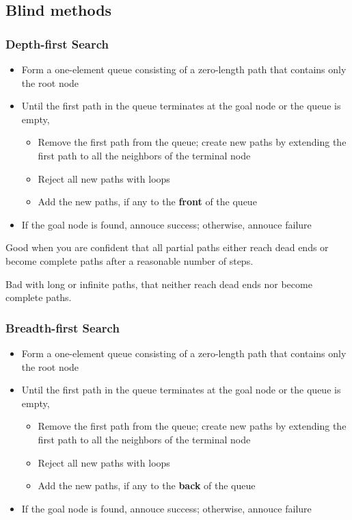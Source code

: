 \documentclass{article}
\begin{document}
\subsection{Blind methods}

\subsubsection{Depth-first Search}

\begin{itemize}
  \item Form a one-element queue consisting of a zero-length path
    that contains only the root node
  \item Until the first path in the queue terminates at the goal node or the queue is empty,
    \begin{itemize}
      \item Remove the first path from the queue; create new paths
        by extending the first path to all the neighbors of the 
        terminal node
      \item Reject all new paths with loops
      \item Add the new paths, if any to the \textbf{front} of the queue
    \end{itemize}
  \item If the goal node is found, annouce success; otherwise, annouce 
    failure
\end{itemize}

Good when you are confident that all partial paths either reach dead ends
or become complete paths after a reasonable number of steps.

Bad with long or infinite paths, that neither reach dead ends 
nor become complete paths.

\subsubsection{Breadth-first Search}

\begin{itemize}
  \item Form a one-element queue consisting of a zero-length path
    that contains only the root node
  \item Until the first path in the queue terminates at the goal node 
    or the queue is empty,
    \begin{itemize}
      \item Remove the first path from the queue; create new paths
        by extending the first path to all the neighbors of the 
        terminal node
      \item Reject all new paths with loops
      \item Add the new paths, if any to the \textbf{back} of the queue
    \end{itemize}
  \item If the goal node is found, annouce success; otherwise, annouce 
    failure
\end{itemize}
\end{document}
